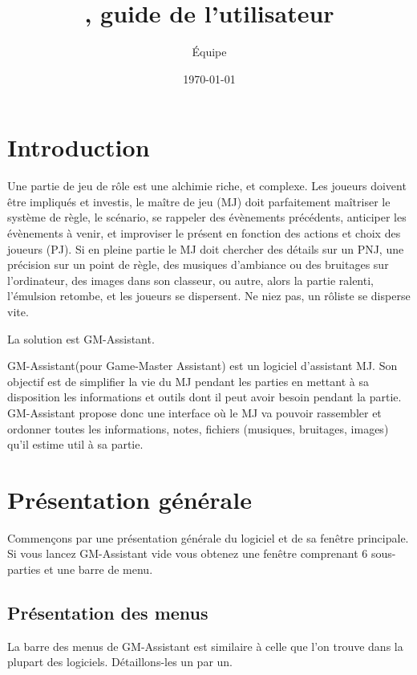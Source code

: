 \documentclass[a4paper,12pt]{article}
\title{\GMA, guide de l'utilisateur}
\author{Équipe \GMA}
\date{\today}
\newcommand*{\GMA}{GM-Assistant\xspace}
\begin{document}
\maketitle

\tableofcontents

\section{Introduction}
Une partie de jeu de rôle est une alchimie riche, et complexe. Les joueurs doivent être impliqués et investis, le maître de jeu (MJ) doit parfaitement maîtriser le système de règle, le scénario, se rappeler des évènements précédents, anticiper les évènements à venir, et improviser le présent en fonction des actions et choix des joueurs (PJ).
Si en pleine partie le MJ doit chercher des détails sur un PNJ, une précision sur un point de règle, des musiques d'ambiance ou des bruitages sur l'ordinateur, des images dans son classeur, ou autre, alors la partie ralenti, l'émulsion retombe, et les joueurs se dispersent. Ne niez pas, un rôliste se disperse vite.

La solution est \GMA.

\GMA (pour Game-Master Assistant) est un logiciel d'assistant MJ. Son objectif est de simplifier la vie du MJ pendant les parties en mettant à sa disposition les informations et outils dont il peut avoir besoin pendant la partie.
\GMA propose donc une interface où le MJ va pouvoir rassembler et ordonner toutes les informations, notes, fichiers (musiques, bruitages, images) qu'il estime util à sa partie.

\section{Présentation générale}
Commençons par une présentation générale du logiciel et de sa fenêtre principale.
Si vous lancez \GMA vide vous obtenez une fenêtre comprenant 6 sous-parties et une barre de menu.
\subsection{Présentation des menus}\label{menu}
La barre des menus de \GMA est similaire à celle que l'on trouve dans la plupart des logiciels. Détaillons-les un par un.
\end{document}
